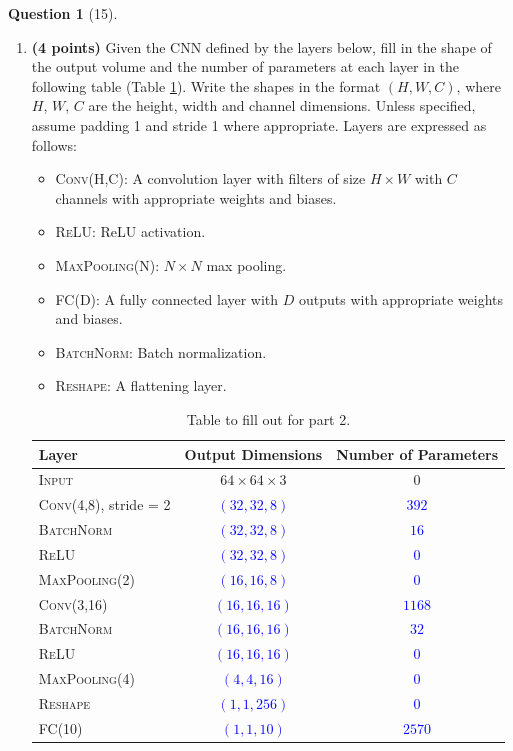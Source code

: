 \documentclass[12pt]{article}
\theoremstyle{definition}
\newtheorem{exercise}{Question}%
\begin{document}
\begin{exercise}[15]
{\begin{enumerate}
\item \textbf{(4 points)} Given the CNN defined by the layers below, fill in the shape of the output volume and the number of parameters at each layer in the following table (Table \ref{tab:cnn-table}). Write the shapes in the format $(H, W, C)$, where $H$, $W$, $C$ are the height, width and channel dimensions. Unless specified, assume padding 1 and stride 1 where appropriate. Layers are expressed as follows:
\begin{itemize}
    \item \textsc{Conv(H,C)}: A convolution layer with filters of size $H\times W$ with $C$ channels with appropriate weights and biases.
    \item \textsc{ReLU}: ReLU activation.
    \item \textsc{MaxPooling(N)}: $N\times N$ max pooling.
    \item \textsc{FC(D)}: A fully connected layer with $D$ outputs with appropriate weights and biases.
    \item \textsc{BatchNorm}: Batch normalization.
    \item \textsc{Reshape}: A flattening layer.
\end{itemize}
\begin{table}[h]
    \centering
    \begin{tabular}{l|c|c}
    \toprule
    Layer & Output Dimensions & Number of Parameters \\
    \midrule
    \textsc{Input} & $64\times 64 \times 3$ & $0$\\
    \textsc{Conv(4,8)}, stride = 2 & \textcolor{blue}{$(32,32,8)$} & \textcolor{blue}{$392$} \\
    \textsc{BatchNorm} & \textcolor{blue}{$(32,32,8)$} & \textcolor{blue}{$16$} \\
    \textsc{ReLU} & \textcolor{blue}{$(32,32,8)$} & \textcolor{blue}{$0$} \\
    \textsc{MaxPooling(2)} & \textcolor{blue}{$(16,16,8)$} & \textcolor{blue}{$0$} \\
    \textsc{Conv(3,16)} & \textcolor{blue}{$(16,16,16)$} & \textcolor{blue}{$1168$} \\
    \textsc{BatchNorm} & \textcolor{blue}{$(16,16,16)$} & \textcolor{blue}{$32$} \\
    \textsc{ReLU} & \textcolor{blue}{$(16,16,16)$} & \textcolor{blue}{$0$} \\
    \textsc{MaxPooling(4)} & \textcolor{blue}{$(4,4,16)$} & \textcolor{blue}{$0$} \\
    \textsc{Reshape} & \textcolor{blue}{$(1,1,256)$} & \textcolor{blue}{$0$} \\
    \textsc{FC(10)} & \textcolor{blue}{$(1,1,10)$} & \textcolor{blue}{$2570$} \\
    \bottomrule
    \end{tabular}
    \caption{Table to fill out for part 2.}
    \label{tab:cnn-table}
\end{table}


\end{enumerate}}
\end{exercise}
\end{document}
